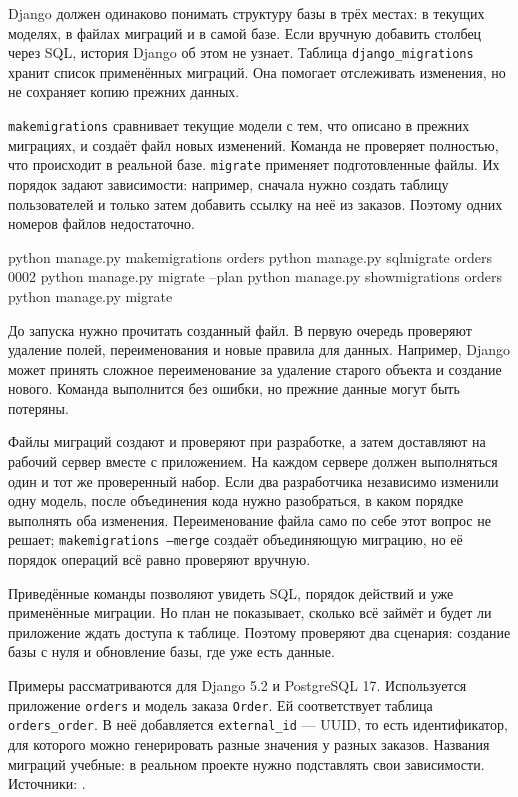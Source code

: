 \documentclass[11pt,a4paper]{article}
\newcommand{\src}[1]{{\small\color{muted}Источники: #1.}}
\begin{document}
Django должен одинаково понимать структуру базы в трёх местах: в текущих моделях, в файлах миграций и в самой базе. Если вручную добавить столбец через SQL, история Django об этом не узнает. Таблица \texttt{django\_migrations} хранит список применённых миграций. Она помогает отслеживать изменения, но не сохраняет копию прежних данных.

\texttt{makemigrations} сравнивает текущие модели с тем, что описано в прежних миграциях, и создаёт файл новых изменений. Команда не проверяет полностью, что происходит в реальной базе. \texttt{migrate} применяет подготовленные файлы. Их порядок задают зависимости: например, сначала нужно создать таблицу пользователей и только затем добавить ссылку на неё из заказов. Поэтому одних номеров файлов недостаточно.
\begin{code}
python manage.py makemigrations orders
python manage.py sqlmigrate orders 0002
python manage.py migrate --plan
python manage.py showmigrations orders
python manage.py migrate
\end{code}

До запуска нужно прочитать созданный файл. В первую очередь проверяют удаление полей, переименования и новые правила для данных. Например, Django может принять сложное переименование за удаление старого объекта и создание нового. Команда выполнится без ошибки, но прежние данные могут быть потеряны.

Файлы миграций создают и проверяют при разработке, а затем доставляют на рабочий сервер вместе с приложением. На каждом сервере должен выполняться один и тот же проверенный набор. Если два разработчика независимо изменили одну модель, после объединения кода нужно разобраться, в каком порядке выполнять оба изменения. Переименование файла само по себе этот вопрос не решает; \texttt{makemigrations --merge} создаёт объединяющую миграцию, но её порядок операций всё равно проверяют вручную.

Приведённые команды позволяют увидеть SQL, порядок действий и уже применённые миграции. Но план не показывает, сколько всё займёт и будет ли приложение ждать доступа к таблице. Поэтому проверяют два сценария: создание базы с нуля и обновление базы, где уже есть данные.

Примеры рассматриваются для Django 5.2 и PostgreSQL 17. Используется приложение \texttt{orders} и модель заказа \texttt{Order}. Ей соответствует таблица \texttt{orders\_order}. В неё добавляется \texttt{external\_id} --- UUID, то есть идентификатор, для которого можно генерировать разные значения у разных заказов. Названия миграций учебные: в реальном проекте нужно подставлять свои зависимости.
\src{\cite{migrations,admin,operations}}
\end{document}
